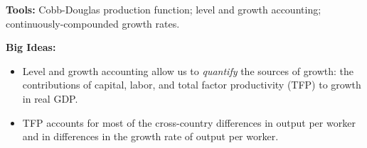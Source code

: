 \textbf{Tools:} Cobb-Douglas production function; level and growth accounting; continuously-compounded growth rates.

\textbf{Big Ideas:}
\begin{itemize}
    \item Level and growth accounting allow us to \emph{quantify} the sources of growth: the contributions of capital, labor, and total factor productivity (TFP) to growth in real GDP.
    \item TFP accounts for most of the cross-country differences in output per worker and in differences in the growth rate of output per worker.
\end{itemize}
